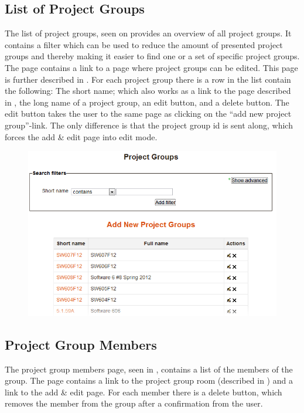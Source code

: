 \subsection{List of Project Groups}
\label{sec:preListPg}
The list of project groups, seen on  provides an overview of all project groups. 
It contains a filter which can be used to reduce the amount of presented project groups and thereby making it easier to find one or a set of specific project groups. 
The page contains a link to a page where project groups can be edited. 
This page is further described in .
For each project group there is a row in the list contain the following: The short name; which also works as a link to the page described in , the long name of a project group, an edit button, and a delete button. 
The edit button takes the user to the same page as clicking on the ``add new project group''-link. 
The only difference is that the project group id is sent along, which forces the add \& edit page into edit mode. 

\begin{figure}
	\centering
		\includegraphics[width=\textwidth]{images/moodleadminprojectgrouplist.png}
	\label{fig:moodleadminprojectgrouplist}
\end{figure}


\FloatBarrier

\subsection{Project Group Members}
\label{sec:projectGrpMem}
The project group members page, seen in , contains a list of the members of the group. 
The page contains a link to the project group room (described in \secref{}) and a link to the add \& edit page. 
For each member there is a delete button, which removes the member from the group after a confirmation from the user.

